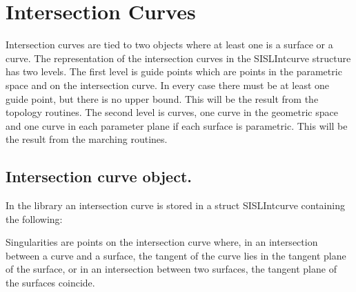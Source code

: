 \section{Intersection Curves}
Intersection curves are tied to two objects where at
least one is a surface or a curve.
The representation of the intersection curves in the SISLIntcurve structure has two levels.
The first level is guide points which are
points in the parametric space and on the intersection
curve. In every case
there must be at least one guide point, but there is no
upper bound. This will be the result from the topology routines.
The second level is curves,
one curve in the geometric space and one curve in each
parameter plane if each surface is parametric. This will be the result from the marching routines.

\subsection{Intersection curve object.}

In the library an intersection curve is stored in a struct SISLIntcurve
containing the following:

Singularities are points on the intersection curve where, in an intersection between a curve and a surface, the tangent
of the curve lies in the tangent plane of the surface, or in an intersection between two surfaces, the tangent plane
of the surfaces coincide.
\pgsbreak

\pgsbreak

\pgsbreak

